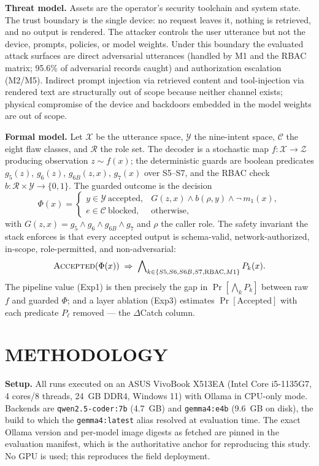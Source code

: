 \documentclass[conference]{IEEEtran}
\begin{document}
\textbf{Threat model.} Assets are the operator's security toolchain and system state. The trust boundary is the single device: no request leaves it, nothing is retrieved, and no output is rendered. The attacker controls the user utterance but not the device, prompts, policies, or model weights. Under this boundary the evaluated attack surfaces are direct adversarial utterances (handled by M1 and the RBAC matrix; 95.6\% of adversarial records caught) and authorization escalation (M2/M5). Indirect prompt injection via retrieved content and tool-injection via rendered text are structurally out of scope because neither channel exists; physical compromise of the device and backdoors embedded in the model weights are out of scope.

\textbf{\textcolor{nscblue}{Formal model.}} Let $\mathcal{X}$ be the utterance space, $\mathcal{Y}$ the nine-intent space, $\mathcal{C}$ the eight flaw classes, and $\mathcal{R}$ the role set. The decoder is a stochastic map $f:\mathcal{X}\to\mathcal{Z}$ producing observation $z\sim f(x)$; the deterministic guards are boolean predicates $g_5(z)$, $g_6(z)$, $g_{6B}(z,x)$, $g_7(x)$ over S5--S7, and the RBAC check $b:\mathcal{R}\times\mathcal{Y}\to\{0,1\}$. The guarded outcome is the decision
\begin{equation}
\Phi(x) = \begin{cases}
y\in\mathcal{Y}\ \text{accepted}, & G(z,x) \wedge b(\rho,y) \wedge \neg\, m_1(x),\\[2pt]
e\in\mathcal{C}\ \text{blocked}, & \text{otherwise},
\end{cases}
\label{eq:decision}
\end{equation}
with $G(z,x)=g_5\wedge g_6\wedge g_{6B}\wedge g_7$ and $\rho$ the caller role. The safety invariant the stack enforces is that every accepted output is schema-valid, network-authorized, in-scope, role-permitted, and non-adversarial:
\begin{equation}
\textsc{Accepted}(\Phi(x)) \;\Rightarrow\; \bigwedge\nolimits_{k\in\{S5,S6,S6B,S7,\mathrm{RBAC},M1\}} P_k(x).
\label{eq:invariant}
\end{equation}
The pipeline value (Exp1) is then precisely the gap in $\Pr\left[\bigwedge_k P_k\right]$ between raw $f$ and guarded $\Phi$; and a layer ablation (Exp3) estimates $\Pr[\mathrm{Accepted}]$ with each predicate $P_\ell$ removed --- the $\Delta$Catch column.

\section{METHODOLOGY}\label{sec:method}
\textbf{Setup.} All runs executed on an ASUS VivoBook X513EA (Intel Core i5-1135G7, 4 cores/8 threads, 24~GB DDR4, Windows 11) with Ollama in CPU-only mode. Backends are \texttt{qwen2.5-coder:7b} (4.7~GB) and \texttt{gemma4:e4b} (9.6~GB on disk), the build to which the \texttt{gemma4:latest} alias resolved at evaluation time. The exact Ollama version and per-model image digests as fetched are pinned in the evaluation manifest, which is the authoritative anchor for reproducing this study. No GPU is used; this reproduces the field deployment.
\end{document}
